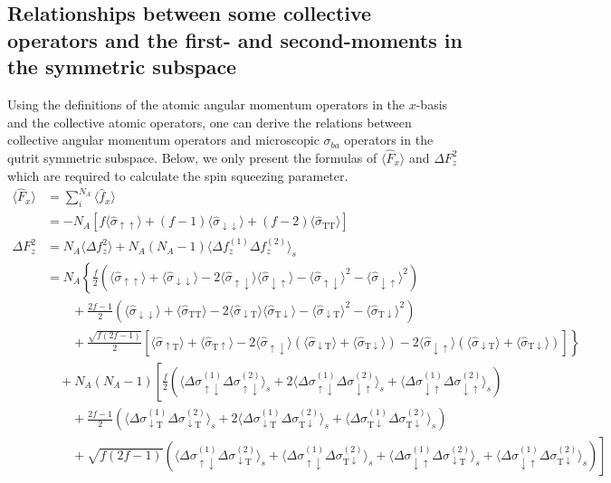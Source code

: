 \documentclass[preprint,aps,pra,onecolumn,superscriptaddress]{revtex4-1} %
\newcommand{\nn}{\nonumber}
\newcommand{\expect}[1]{\big\langle #1 \big\rangle}
\newcommand{\sigmauu}{\hat{\sigma}_{\uparrow\uparrow}}
\newcommand{\sigmaud}{\hat{\sigma}_{\uparrow\downarrow}}
\newcommand{\sigmaut}{\hat{\sigma}_{\uparrow \mathrm{T}}}
\newcommand{\sigmadu}{\hat{\sigma}_{\downarrow\uparrow}}
\newcommand{\sigmadd}{\hat{\sigma}_{\downarrow\downarrow}}
\newcommand{\sigmadt}{\hat{\sigma}_{\downarrow \mathrm{T}}}
\newcommand{\sigmatu}{\hat{\sigma}_{\mathrm{T}\uparrow}}
\newcommand{\sigmatd}{\hat{\sigma}_{\mathrm{T}\downarrow}}
\newcommand{\sigmatt}{\hat{\sigma}_{\mathrm{T}\mathrm{T}}}
\newcommand{\Dsigmaud}{\Delta\sigma_{\uparrow\downarrow}}
\newcommand{\Dsigmadu}{\Delta\sigma_{\downarrow\uparrow}}
\newcommand{\Dsigmadt}{\Delta\sigma_{\downarrow \mathrm{T}}}
\newcommand{\Dsigmatd}{\Delta\sigma_{\mathrm{T}\downarrow}}
\begin{document}
\begin{appendix}
\section{Relationships between some collective operators and the first- and second-moments in the symmetric subspace} \label{Appendix::collectivespinoperators}

Using the definitions of the atomic angular momentum operators in the $ x $-basis and the collective atomic operators, one can derive the relations between collective angular momentum operators and microscopic $\sigma_{ba}$ operators in the qutrit symmetric subspace. Below, we only present the formulas of $ \expect{\hat{F}_x} $ and $ \Delta F^2_z $ which are required to calculate the spin squeezing parameter.
\begin{subequations}
	\begin{align}
	\expect{\hat{F}_x} &= \sum_i^{N_A}\expect{\hat{f}_x}\nonumber\\
	&= -N_A \left[f\expect{\sigmauu}+(f-1)\expect{\sigmadd}+(f-2)\expect{\sigmatt } \right]\\
	\Delta F_z^2 &= N_A\expect{\Delta f_z^2} + N_A(N_A-1)\expect{\Delta f_z^{(1)}\Delta f_z^{(2)} }_s\nn\\
	&=N_A\left\{ \frac{f}{2}\left(\expect{\sigmauu}+\expect{\sigmadd}-2\expect{\sigmaud}\expect{\sigmadu}-\expect{\sigmaud}^2-\expect{\sigmadu}^2 \right)\right. \nn\\
	&\quad\quad+ \frac{2f-1}{2}\left(\expect{\sigmadd}+\expect{\sigmatt}-2\expect{\sigmadt}\expect{\sigmatd}-\expect{\sigmadt}^2-\expect{\sigmatd}^2 \right)\nn\\
	&\quad\quad +\left. \frac{\sqrt{f(2f-1)}}{2}\left[\expect{\sigmaut }+\expect{\sigmatu} -2\expect{\sigmaud}(\expect{\sigmadt}+\expect{\sigmatd}) -2\expect{\sigmadu}(\expect{\sigmadt}+\expect{\sigmatd} ) \right] \right\}\nn\\
	&\quad +N_A(N_A-1)\left[\frac{f}{2}(\expect{\Dsigmaud^{(1)}\Dsigmaud^{(2)} }_s +2\expect{\Dsigmaud^{(1)}\Dsigmadu^{(2)} }_s+\expect{\Dsigmadu^{(1)}\Dsigmadu^{(2)} }_s )\right.\\
	&\quad\quad + \frac{2f-1}{2}(\expect{\Dsigmadt^{(1)}\Dsigmadt^{(2)} }_s +2\expect{\Dsigmadt^{(1)}\Dsigmatd^{(2)} }_s +\expect{\Dsigmatd^{(1)}\Dsigmatd^{(2)} }_s) \nn\\
	&\quad\quad + \left. \sqrt{f(2f-1)}(\expect{\Dsigmaud^{(1)}\Dsigmadt^{(2)} }_s +\expect{\Dsigmaud^{(1)}\Dsigmatd^{(2)} }_s +\expect{\Dsigmadu^{(1)}\Dsigmadt^{(2)} }_s+\expect{\Dsigmadu^{(1)}\Dsigmatd^{(2)} }_s )\right]\nn
	\end{align}
\end{subequations}



\end{appendix}
\end{document}
